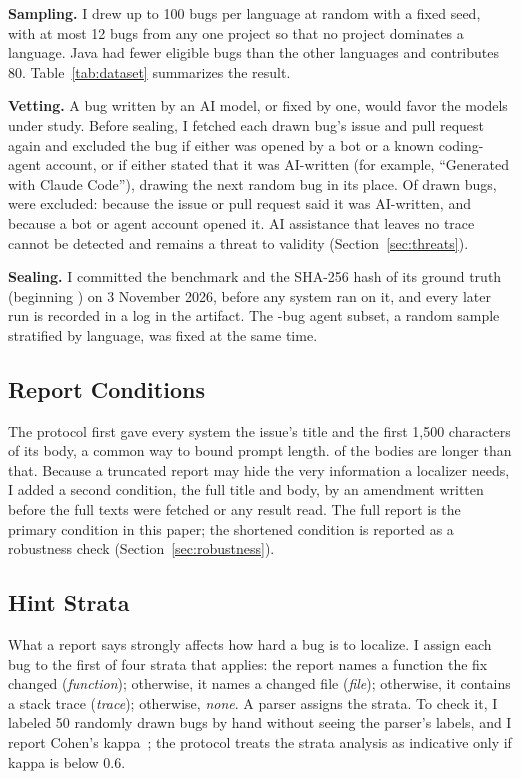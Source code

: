 \documentclass[acmsmall,screen,review,anonymous]{acmart}
\begin{document}
\textbf{Sampling.} I drew up to 100 bugs per language at random with a fixed seed, with at most 12 bugs from any one project so that no project dominates a language. Java had fewer eligible bugs than the other languages and contributes 80. Table~\ref{tab:dataset} summarizes the result.



\textbf{Vetting.} A bug written by an AI model, or fixed by one, would favor the models under study. Before sealing, I fetched each drawn bug's issue and pull request again and excluded the bug if either was opened by a bot or a known coding-agent account, or if either stated that it was AI-written (for example, ``Generated with Claude Code''), drawing the next random bug in its place. Of \NVetted{} drawn bugs, \NVetExcluded{} were excluded: \NVetAI{} because the issue or pull request said it was AI-written, and \NVetBot{} because a bot or agent account opened it. AI assistance that leaves no trace cannot be detected and remains a threat to validity (Section~\ref{sec:threats}).

\textbf{Sealing.} I committed the benchmark and the SHA-256 hash of its ground truth (beginning \texttt{\GoldHash}) on 3 November 2026, before any system ran on it, and every later run is recorded in a log in the artifact. The \NAgent{}-bug agent subset, a random sample stratified by language, was fixed at the same time.

\subsection{Report Conditions}

The protocol first gave every system the issue's title and the first 1,500 characters of its body, a common way to bound prompt length. \NLonger{} of the \NBugs{} bodies are longer than that. Because a truncated report may hide the very information a localizer needs, I added a second condition, the full title and body, by an amendment written before the full texts were fetched or any result read. The full report is the primary condition in this paper; the shortened condition is reported as a robustness check (Section~\ref{sec:robustness}).

\subsection{Hint Strata}

What a report says strongly affects how hard a bug is to localize. I assign each bug to the first of four strata that applies: the report names a function the fix changed (\emph{function}); otherwise, it names a changed file (\emph{file}); otherwise, it contains a stack trace (\emph{trace}); otherwise, \emph{none}. A parser assigns the strata. To check it, I labeled 50 randomly drawn bugs by hand without seeing the parser's labels, and I report Cohen's kappa~\cite{cohen1960kappa}; the protocol treats the strata analysis as indicative only if kappa is below 0.6.
\end{document}
